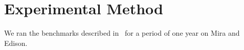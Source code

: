\section{Experimental Method}

We ran the benchmarks described in~\cite{Lockwood2017} for a period of one year on Mira and Edison.

